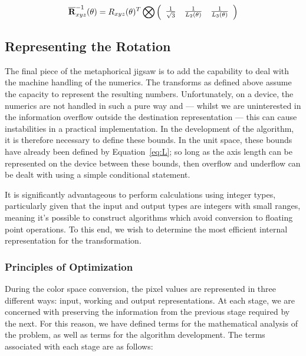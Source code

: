 \begin{equation}\label{eq:NormRxyz3Inverse}
 \overline{\R}_{xyz}^{-1}(\theta) =
 R_{xyz}(\theta)^{T} \bigotimes
\left(
\begin{array}{ccc}
 \frac{1}{\sqrt{3}}  &
 \frac{1}{L_2(\theta)} &
 \frac{1}{L_3(\theta) }
\end{array}
\right)
\end{equation}

\subsection{Representing the Rotation}

The final piece of the metaphorical jigsaw is to add the capability to deal with the machine handling of the numerics. The transforms as defined above assume the capacity to represent the resulting numbers. Unfortunately, on a device, the numerics are not handled in such a pure way and --- whilst we are uninterested in the information overflow outside the destination representation --- this can cause instabilities in a practical implementation. In the development of the algorithm, it is therefore necessary to define these bounds. In the unit space, these bounds have already been defined by Equation~\ref{eq:L}; so long as the axis length can be represented on the device between these bounds, then overflow and underflow can be dealt with using a simple conditional statement.

It is significantly advantageous to perform calculations using integer types, particularly given that the input and output types are integers with small ranges, meaning it's possible to construct algorithms which avoid conversion to floating point operations. To this end, we wish to determine the most efficient internal representation for the transformation.

\subsubsection{Principles of Optimization}

During the color space conversion, the pixel values are represented in three different ways: input, working and output representations. At each stage, we are concerned with preserving the information from the previous stage required by the next. For this reason, we have defined terms for the mathematical analysis of the problem, as well as terms for the algorithm development. The terms associated with each stage are as follows:


